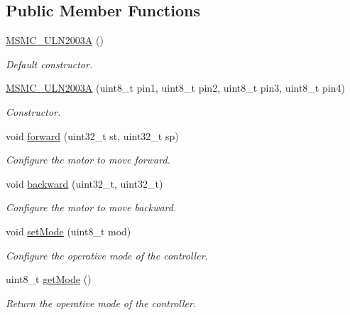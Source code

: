 \subsection*{Public Member Functions}
\begin{DoxyCompactItemize}
\item 
\hyperlink{class_m_s_m_c___u_l_n2003_a_a7b3b007290d0913572c5d42f23f6ed9a}{M\+S\+M\+C\+\_\+\+U\+L\+N2003\+A} ()
\begin{DoxyCompactList}\small\item\em Default constructor. \end{DoxyCompactList}\item 
\hyperlink{class_m_s_m_c___u_l_n2003_a_ae653d15c96f4e8ddfb4476cc77495ad1}{M\+S\+M\+C\+\_\+\+U\+L\+N2003\+A} (uint8\+\_\+t pin1, uint8\+\_\+t pin2, uint8\+\_\+t pin3, uint8\+\_\+t pin4)
\begin{DoxyCompactList}\small\item\em Constructor. \end{DoxyCompactList}\item 
void \hyperlink{class_m_s_m_c___u_l_n2003_a_a9657492f948a75472b311bc0b823899f}{forward} (uint32\+\_\+t st, uint32\+\_\+t sp)
\begin{DoxyCompactList}\small\item\em Configure the motor to move forward. \end{DoxyCompactList}\item 
void \hyperlink{class_m_s_m_c___u_l_n2003_a_ac46e6ec6345f95b534079bcf2920885e}{backward} (uint32\+\_\+t, uint32\+\_\+t)
\begin{DoxyCompactList}\small\item\em Configure the motor to move backward. \end{DoxyCompactList}\item 
void \hyperlink{class_m_s_m_c___u_l_n2003_a_a8a7f8b7e0048b3a03c87bd830d4a455f}{set\+Mode} (uint8\+\_\+t mod)
\begin{DoxyCompactList}\small\item\em Configure the operative mode of the controller. \end{DoxyCompactList}\item 
uint8\+\_\+t \hyperlink{class_m_s_m_c___u_l_n2003_a_a84cbd656e77e789af5cb34df147589a3}{get\+Mode} ()
\begin{DoxyCompactList}\small\item\em Return the operative mode of the controller. \end{DoxyCompactList}\item 

\end{DoxyCompactItemize}
